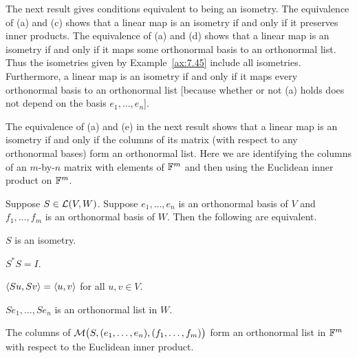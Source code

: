 The next result gives conditions equivalent to being an isometry. The
equivalence of (a) and (c) shows that a linear map is an isometry if and only if
it preserves inner products. The equivalence of (a) and (d) shows that a linear
map is an isometry if and only if it maps some orthonormal basis to an
orthonormal list. Thus the isometries given by Example~\ref{ax:7.45} include all
isometries. Furthermore, a linear map is an isometry if and only if it maps
every orthonormal basis to an orthonormal list [because whether or not (a) holds
does not depend on the basis $e_1,\dots,e_n$].

The equivalence of (a) and (e) in the next result shows that a linear map is an
isometry if and only if the columns of its matrix (with respect to any
orthonormal bases) form an orthonormal list. Here we are identifying the columns
of an $m$-by-$n$ matrix with elements of $\mathbb{F}^m$ and then using the Euclidean
inner product on $\mathbb{F}^m$.

\begin{result}\label{ax:7.49}
Suppose $S\in\mathcal{L}(V,W)$. Suppose $e_1,\dots,e_n$ is an orthonormal basis of $V$
and $f_1,\dots,f_m$ is an orthonormal basis of $W$. Then the following are
equivalent.
\begin{parts}
\item $S$ is an isometry.
\item $S^*S=I$.
\item $\langle Su, Sv \rangle=\langle u, v \rangle$ for all $u,v\in V$.
\item $Se_1,\dots,Se_n$ is an orthonormal list in $W$.
\item The columns of $\mathcal{M}\bigl(S,(e_1,\dots,e_n),(f_1,\dots,f_m)\bigr)$ form an
  orthonormal list in $\mathbb{F}^m$ with respect to the Euclidean inner product.
\end{parts}
\end{result}

